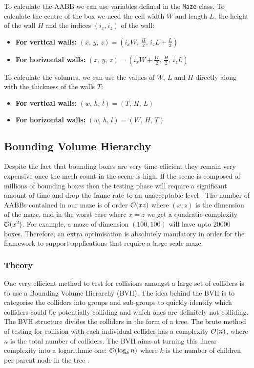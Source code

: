 To calculate the AABB we can use variables defined in the \texttt{Maze} class. To calculate the centre of the box we need the cell width $W$ and length $L$, the height of the wall $H$ and the indices $(i_x, i_z)$ of the wall:
\begin{itemize}
\item {\bf For vertical walls:} $(x,\,y,\,z)= (i_{x}W,\, \frac{H}{2},\, i_{z}L+\frac{L}{2})$
\item {\bf For horizontal walls:} $(x,\,y,\,z)= (i_{x}W+\frac{W}{2},\, \frac{H}{2} ,\, i_{z}L)$
\end{itemize}
To calculate the volumes, we can use the values of $W$, $L$ and $H$ directly along with the thickness of the walls $T$:
\begin{itemize}
\item {\bf For vertical walls:} $(w,\,h,\,l)= (T,\, H,\, L)$
\item {\bf For horizontal walls:} $(w,\,h,\,l)= (W,\, H,\, T)$
\end{itemize}

\subsection{Bounding Volume Hierarchy}
Despite the fact that bounding boxes are very time-efficient they remain very expensive once the mesh count in the scene is high. If the scene is composed of millions of bounding boxes then the testing phase will require a significant amount of time and drop the frame rate to an unacceptable level \citep{BVH}. The number of AABBs contained in our maze is of order $\mathcal{O} (xz)$ where $(x,z)$ is the dimension of the maze, and in the worst case where $x=z$ we get a quadratic complexity $\mathcal{O} (x^2)$. For example, a maze of dimension $(100,100)$ will have upto $20 000$ boxes. Therefore, an extra optimisation is absolutely mandatory in order for the framework to support applications that require a large scale maze.

\subsubsection{Theory}
One very efficient method to test for collisions amongst a large set of colliders is to use a Bounding Volume Hierarchy (BVH). The idea behind the BVH is to categorise the colliders into groups and sub-groups to quickly identify which colliders could be potentially colliding and which ones are definitely not colliding. The BVH structure divides the colliders in the form of a tree. The brute method of testing for collision with each individual collider has a complexity $\mathcal{O} (n)$, where $n$ is the total number of colliders. The BVH aims at turning this linear complexity into a logarithmic one: $\mathcal{O} (\log_{k}n)$ where $k$ is the number of children per parent node in the tree \citep{BVH}. 

